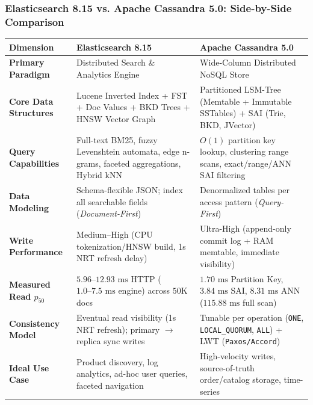 \documentclass[aspectratio=169]{beamer}
\begin{document}
\begin{frame}
\frametitle{Elasticsearch 8.15 vs. Apache Cassandra 5.0: Side-by-Side Comparison}
\centering
\tiny
\renewcommand{\arraystretch}{0.95}
\begin{tabular}{p{2.4cm}p{5.4cm}p{5.5cm}}
\toprule
\textbf{Dimension} & \textbf{Elasticsearch 8.15} \cite{elastic_docs} & \textbf{Apache Cassandra 5.0} \cite{cassandra_docs} \\
\midrule
\textbf{Primary Paradigm} & Distributed Search \& Analytics Engine & Wide-Column Distributed NoSQL Store \\
\midrule
\textbf{Core Data Structures} & Lucene Inverted Index + FST + Doc Values + BKD Trees + HNSW Vector Graph & Partitioned LSM-Tree (Memtable + Immutable SSTables) + SAI (Trie, BKD, JVector) \\
\midrule
\textbf{Query Capabilities} & Full-text BM25, fuzzy Levenshtein automata, edge n-grams, faceted aggregations, Hybrid kNN & $O(1)$ partition key lookup, clustering range scans, exact/range/ANN SAI filtering \\
\midrule
\textbf{Data Modeling} & Schema-flexible JSON; index all searchable fields (\emph{Document-First}) & Denormalized tables per access pattern (\emph{Query-First}) \\
\midrule
\textbf{Write Performance} & Medium--High (CPU tokenization/HNSW build, 1s NRT refresh delay) & Ultra-High (append-only commit log + RAM memtable, immediate visibility) \\
\midrule
\textbf{Measured Read $p_{50}$} & $5.96\text{--}12.93\text{ ms}$ HTTP ($1.0\text{--}7.5\text{ ms}$ engine) across $50\text{K}$ docs & $1.70\text{ ms}$ Partition Key, $3.84\text{ ms}$ SAI, $8.31\text{ ms}$ ANN ($115.88\text{ ms}$ full scan) \\
\midrule
\textbf{Consistency Model} & Eventual read visibility (1s NRT refresh); primary $\rightarrow$ replica sync writes & Tunable per operation (\texttt{ONE}, \texttt{LOCAL\_QUORUM}, \texttt{ALL}) + LWT (\texttt{Paxos/Accord}) \\
\midrule
\textbf{Ideal Use Case} & Product discovery, log analytics, ad-hoc user queries, faceted navigation & High-velocity writes, source-of-truth order/catalog storage, time-series \\
\bottomrule
\end{tabular}
\end{frame}
\end{document}
